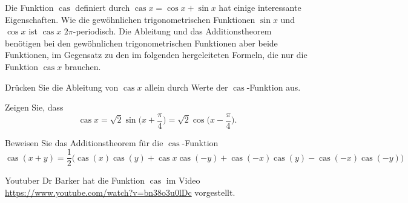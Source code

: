 \def\cas{\operatorname{cas}}
Die Funktion $\cas$ definiert durch
$\cas x = \cos x + \sin x$ hat einige interessante Eigenschaften.
Wie die gewöhnlichen trigonometrischen Funktionen $\sin x$ und $\cos x$
ist $\cas x$ $2\pi$-periodisch.
Die Ableitung und das Additionstheorem benötigen bei den gewöhnlichen
trigonometrischen Funktionen aber beide Funktionen, im Gegensatz zu den
im folgenden hergeleiteten Formeln, die nur die Funktion $\cas x$ brauchen.
\begin{teilaufgaben}
\item
Drücken Sie die Ableitung von $\cas x$  allein durch Werte der
$\cas$-Funktion aus.
\item
Zeigen Sie, dass 
\[
\cas x
=
\sqrt{2} \sin\biggl(x+\frac{\pi}4\biggr)
=
\sqrt{2} \cos\biggl(x-\frac{\pi}4\biggr).
\]
\item
Beweisen Sie das Additionstheorem für die $\cas$-Funktion
\begin{equation}
\cas(x+y)
=
\frac12\bigl(
\cas(x)\cas(y) + \cas x\cas (-y) + \cas(-x)\cas(y) -\cas(-x)\cas(-y)
\bigr)
\label{buch:geometrie:uebung3:eqn:addition}
\end{equation}
\end{teilaufgaben}
Youtuber Dr Barker hat die Funktion $\cas$ im Video
{\small\url{https://www.youtube.com/watch?v=bn38o3u0lDc}} vorgestellt.

